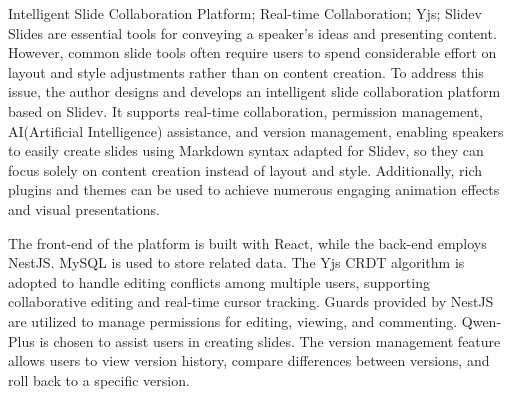 \begin{englishabstract}
{Intelligent Slide Collaboration Platform; Real-time Collaboration; Yjs; Slidev}
Slides are essential tools for conveying a speaker’s ideas and presenting content. However, common slide tools often require users to spend considerable effort on layout and style adjustments rather than on content creation. To address this issue, the author designs and develops an intelligent slide collaboration platform based on Slidev. It supports real-time collaboration, permission management, AI(Artificial Intelligence) assistance, and version management, enabling speakers to easily create slides using Markdown syntax adapted for Slidev, so they can focus solely on content creation instead of layout and style. Additionally, rich plugins and themes can be used to achieve numerous engaging animation effects and visual presentations.

The front-end of the platform is built with React, while the back-end employs NestJS. MySQL is used to store related data. The Yjs CRDT algorithm is adopted to handle editing conflicts among multiple users, supporting collaborative editing and real-time cursor tracking. Guards provided by NestJS are utilized to manage permissions for editing, viewing, and commenting. Qwen-Plus is chosen to assist users in creating slides. The version management feature allows users to view version history, compare differences between versions, and roll back to a specific version.
\end{englishabstract}




